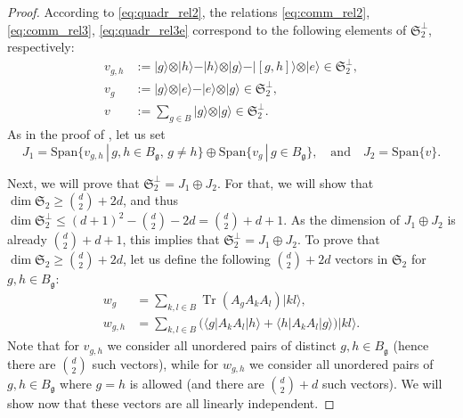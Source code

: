 \documentclass[a4paper]{article}
\newcommand{\ket}[1]{\vert #1 \rangle}
\newcommand{\bra}[1]{\langle #1 \vert}
\newcommand{\tr}{\operatorname{Tr}}
\newcommand{\Span}{\mathrm{Span}}
\theoremstyle{definition}
\begin{document}
\begin{proof}
According to \eqref{eq:quadr_rel2}, the relations \eqref{eq:comm_rel2}, \eqref{eq:comm_rel3}, \eqref{eq:quadr_rel3e} correspond to the following elements of $\mathfrak{S}_2^\perp$, respectively:
\begin{align}\label{eq:v_rel2}
    v_{g,h} &:= \ket{g} \otimes \ket{h} - \ket{h} \otimes \ket{g} - \ket{[g,h]} \otimes \ket{e} \in \mathfrak{S}_2^\perp, \\ \label{eq:v_rel3}
    v_{g} &:= \ket{g} \otimes \ket{e} - \ket{e} \otimes \ket{g} \in \mathfrak{S}_2^\perp, \\ \label{eq:v_quadr}
    v &:= \sum_{g\in B} \ket{g} \otimes \ket{g} \in \mathfrak{S}_2^\perp.
\end{align}
As in the proof of , let us set 
\begin{equation*}
  J_1 = \Span\{ v_{g,h} \,|\, g,h\in B_{\mathfrak{g}},\,g\ne h \} \oplus \Span\{ v_{g} \,|\, g\in B_{\mathfrak{g}} \}, \quad \text{and} \quad J_2 = \Span\{v\}. 
\end{equation*}

Next, we will prove that $\mathfrak{S}_2^\perp  = J_1 \oplus J_2$.  For that, we will show that $\dim \mathfrak{S}_2 \geq \binom{d}{2} +2d$, and thus $\dim \mathfrak{S}_2^\perp \leq (d+1)^2 - \binom{d}{2} - 2d = \binom{d}{2} + d + 1$. As the dimension of $J_1 \oplus J_2$  is already $\binom{d}{2} + d + 1$, this implies that $\mathfrak{S}_2^\perp  = J_1 \oplus J_2$. To prove that $\dim \mathfrak{S}_2 \geq \binom{d}{2} +2d$, let us define the following $\binom{d}{2} +2d$ vectors in $\mathfrak{S}_2$ for $g,h\in B_{\mathfrak{g}}$:
\begin{align}
    w_g &= \sum_{k,l\in B} \tr (A_g A_k A_l) \ket{kl}, \label{eq:wg} \\ 
    w_{g,h} &= \sum_{k,l\in B} \bigl(\bra{g} A_k A_l \ket{h} + \bra{h} A_k A_l \ket{g}\bigr) \ket{kl}. \label{eq:wgh}
\end{align}
Note that for $v_{g,h}$ we consider all unordered pairs of distinct $g,h\in B_{\mathfrak{g}}$ (hence there are $\binom{d}{2}$ such vectors), while 
for $w_{g,h}$ we consider all unordered pairs of $g,h\in B_{\mathfrak{g}}$ where $g=h$ is allowed (and there are $\binom{d}{2}+d$ such vectors). We will show now that these vectors are all linearly independent. 


\end{proof}
\end{document}
